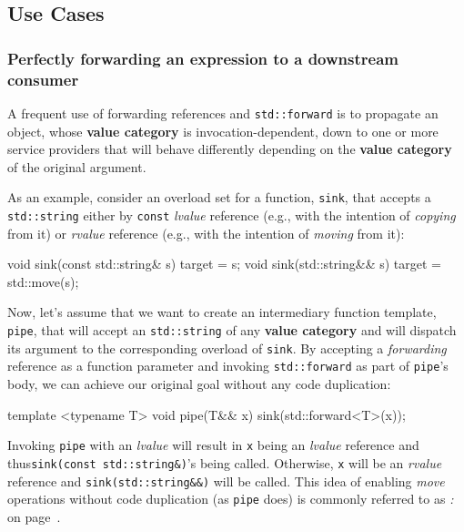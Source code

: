 \subsection[Use Cases]{Use Cases}\label{use-cases-forwardingref}

\subsubsection[Perfectly forwarding an expression to a downstream consumer]{Perfectly forwarding an expression to a downstream consumer}\label{perfectly-forwarding-an-expression-to-a-downstream-consumer}

A frequent use of forwarding references and \texttt{std::forward} is to
propagate an object, whose \textbf{value category} is
invocation-dependent, down to one or more service providers that will
behave differently depending on the \textbf{value category} of the
original argument.

As an example, consider an overload set for a function, \texttt{sink},
that accepts a \texttt{std::string} either by \texttt{const}
\emph{lvalue} reference (e.g., with the intention of \textit{copying} from it) or
\emph{rvalue} reference (e.g., with the intention of \textit{moving} from it):

\begin{emcppslisting}
void sink(const std::string& s) { target = s; }
void sink(std::string&& s)      { target = std::move(s); }
\end{emcppslisting}

\noindent Now, let's assume that we want to create an intermediary function
template, \texttt{pipe}, that will accept an \texttt{std::string} of any
\textbf{value category} and will dispatch its argument to the
corresponding overload of \texttt{sink}. By accepting a
\emph{forwarding} reference as a function parameter and invoking
\texttt{std::forward} as part of \texttt{pipe}'s body, we can achieve
our original goal without any code duplication:

\begin{emcppslisting}
template <typename T>
void pipe(T&& x)
{
    sink(std::forward<T>(x));
}
\end{emcppslisting}

\noindent Invoking \texttt{pipe} with an \emph{lvalue} will result in \texttt{x}
being an \emph{lvalue} reference and thus\linebreak[4]%
\mbox{\texttt{sink(const}~\texttt{std::string\&)}'s} being called. Otherwise,
\texttt{x} will be an \emph{rvalue} reference and
\texttt{sink(std::string\&\&)} will be called. This idea of enabling
\emph{move} operations without code duplication (as \texttt{pipe} does)
is commonly referred to as \textit{: } on page~\pageref{perfect-forwarding-for-generic-factory-functions}.

